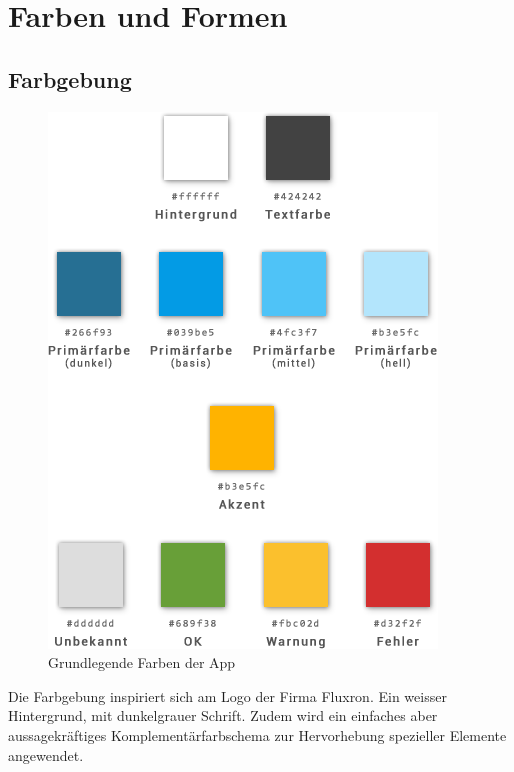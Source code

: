 
\section{Farben und Formen}
\label{sec:Farben und Formen}

\subsection{Farbgebung}
\label{subsec:Farbgebung}
\begin{figure}[H]
    \begin{center}
        \includegraphics[trim=0 130 0 0,clip,scale=0.5]{uiux/res/basic_colors}
    \end{center}
    \caption{Grundlegende Farben der App}
\end{figure}
Die Farbgebung inspiriert sich am Logo der Firma Fluxron. Ein weisser Hintergrund, mit dunkelgrauer Schrift. Zudem wird ein einfaches aber aussagekräftiges Komplementärfarbschema zur Hervorhebung spezieller Elemente angewendet.

